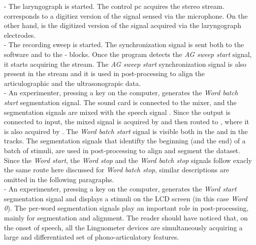  - The  laryngograph is started. 
The  control pc acquires the  stereo stream. 
 corresponds to a digitiez version of the 
signal sensed via the  microphone.
On the other hand,  is the digitized version of the signal acquired
via the laryngograph electrodes.\\

 - The  recording sweep is started.
The  synchronization signal is sent both to the 
software and to the - blocks.
Once the  program detects the \emph{AG sweep start} signal, it
starts acquiring the  stream.
The \emph{AG sweep start} synchronization signal is also present in the
 stream and it is used in post-processing to align the
articulographic and the ultrasonograpic data.\\

 - An experimenter, pressing a key on the  computer,
generates the \emph{Word batch start} segmentation signal.
The  sound card is connected to the  mixer, and the
segmentation signals are mixed with the speech signal .
Since the  output is connected to  input, the mixed
signal is acquired by  and then routed to , where it is also
acquired by .
The \emph{Word batch start} signal is visible both in the  and in
the  tracks.
The segmentation signals that identifty the beginning (and the end) of a batch
of stimuli, are used in post-processing to align and segment the dataset.
Since the \emph{Word start}, the \emph{Word stop} and the \emph{Word batch stop}
signals follow exacly the same route here discussed for \emph{Word batch
stop}, similar descriptions are omitted in the following paragraphs.\\

 - An experimenter, pressing a key on the  computer, 
generates the  \emph{Word start} segmentation signal and displays a stimuli 
on the LCD screen (in this case \emph{Word 0}).
The per-word segmentation signals play an important role in post-processing,
mainly for segmentation and alignment.
The reader should have noticed that, on the onset of speech, all the Linguometer
devices are simultaneously acquiring a large and differentiated set of 
phono-articulatory features.\\

